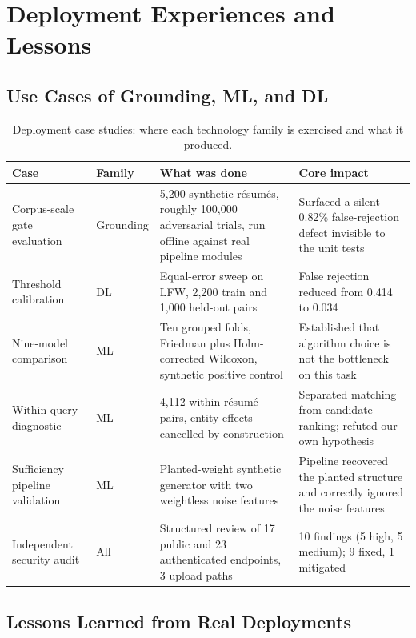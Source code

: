 \section{Deployment Experiences and Lessons}
\label{sec:deployment}

\subsection{Use Cases of Grounding, ML, and DL}

\begin{table}[t]
\caption{Deployment case studies: where each technology family is exercised and
what it produced.}
\label{tab:cases}
\small
\begin{tabular}{@{}p{2.8cm}p{2.0cm}p{5.2cm}p{5.6cm}@{}}
\toprule
Case & Family & What was done & Core impact \\
\midrule
Corpus-scale gate evaluation & Grounding & 5{,}200 synthetic résumés, roughly
100{,}000 adversarial trials, run offline against real pipeline modules &
Surfaced a silent 0.82\% false-rejection defect invisible to the unit tests \\
Threshold calibration & DL & Equal-error sweep on LFW, 2{,}200 train and 1{,}000
held-out pairs & False rejection reduced from 0.414 to 0.034 \\
Nine-model comparison & ML & Ten grouped folds, Friedman plus Holm-corrected
Wilcoxon, synthetic positive control & Established that algorithm choice is not
the bottleneck on this task \\
Within-query diagnostic & ML & 4{,}112 within-résumé pairs, entity effects
cancelled by construction & Separated matching from candidate ranking; refuted
our own hypothesis \\
Sufficiency pipeline validation & ML & Planted-weight synthetic generator with
two weightless noise features & Pipeline recovered the planted structure and
correctly ignored the noise features \\
Independent security audit & All & Structured review of 17 public and 23
authenticated endpoints, 3 upload paths & 10 findings (5 high, 5 medium); 9
fixed, 1 mitigated \\
\bottomrule
\end{tabular}
\end{table}

\subsection{Lessons Learned from Real Deployments}

